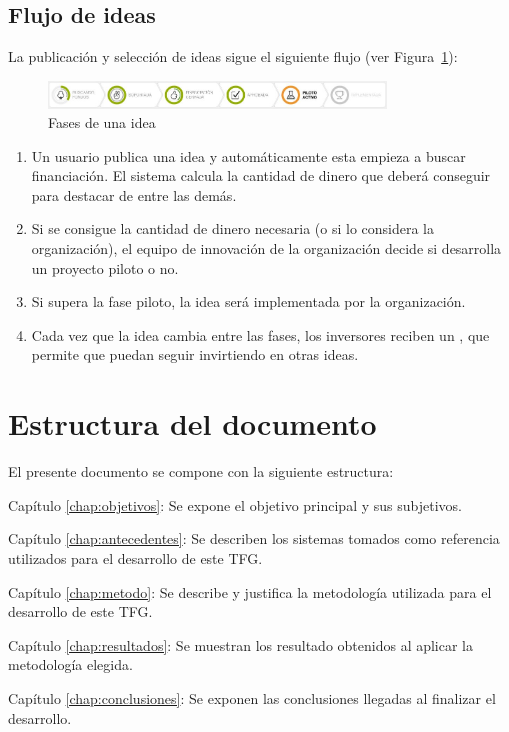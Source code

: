  \subsection{Flujo de ideas}
 
 La publicación y selección de ideas sigue el siguiente flujo (ver Figura~\ref{fig:flujo}):
 
 \begin{figure}[!h]
 \begin{center}
 \includegraphics[width=0.8\textwidth]{./img/introduccion/flujo.png}
 \caption{Fases de una idea}
 \label{fig:flujo}
 \end{center}
 \end{figure}
 
 \begin{enumerate}
 	\item Un usuario publica una idea y automáticamente esta empieza a buscar financiación. El sistema calcula la cantidad de dinero que deberá conseguir para destacar de entre las demás.
 	\item Si se consigue la cantidad de dinero necesaria (o si lo considera la organización), el equipo de
 	 innovación de la organización decide si desarrolla un proyecto piloto o no.
 	 \item Si supera la fase piloto, la idea será implementada por la organización.
 	 \item Cada vez que la idea cambia entre las fases, los inversores reciben un , que permite
 	 que puedan seguir invirtiendo en otras ideas.
 \end{enumerate}
 
  
 
\section{Estructura del documento}

El presente documento se compone con la siguiente estructura:

\begin{definitionlist}
\item[Capítulo \ref{chap:objetivos}: \nameref{chap:objetivos}] Se expone el objetivo principal y sus subjetivos.
 \item[Capítulo \ref{chap:antecedentes}: \nameref{chap:antecedentes}] Se describen los sistemas tomados como referencia utilizados para 
 el desarrollo de este \acs{TFG}.
  \item [Capítulo \ref{chap:metodo}: \nameref{chap:metodo}] Se describe y justifica la metodología utilizada para el desarrollo de este \acs{TFG}.
  \item[Capítulo \ref{chap:resultados}: \nameref{chap:resultados}] Se muestran los resultado obtenidos al aplicar la metodología elegida.
  \item[Capítulo \ref{chap:conclusiones}: \nameref{chap:conclusiones}] Se exponen las conclusiones llegadas al finalizar el desarrollo.
\end{definitionlist}

